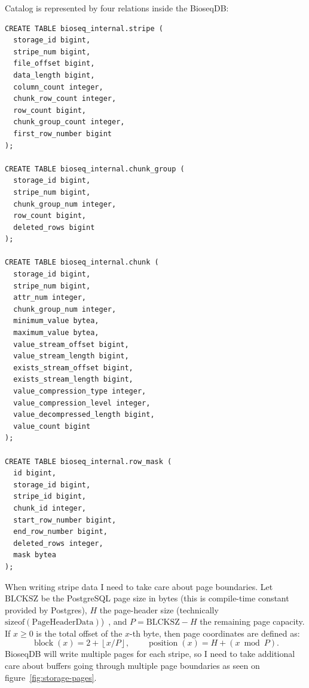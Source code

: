 Catalog is represented by four relations inside the BioseqDB:

\begin{minipage}{\linewidth}
\begin{lstlisting}[style=bioseq-storage-sql,caption={Metadata catalogs for flushed stripes.},label={lst:storage-metadata-catalogs}]
CREATE TABLE bioseq_internal.stripe (
  storage_id bigint,
  stripe_num bigint,
  file_offset bigint,
  data_length bigint,
  column_count integer,
  chunk_row_count integer,
  row_count bigint,
  chunk_group_count integer,
  first_row_number bigint
);

CREATE TABLE bioseq_internal.chunk_group (
  storage_id bigint,
  stripe_num bigint,
  chunk_group_num integer,
  row_count bigint,
  deleted_rows bigint
);

CREATE TABLE bioseq_internal.chunk (
  storage_id bigint,
  stripe_num bigint,
  attr_num integer,
  chunk_group_num integer,
  minimum_value bytea,
  maximum_value bytea,
  value_stream_offset bigint,
  value_stream_length bigint,
  exists_stream_offset bigint,
  exists_stream_length bigint,
  value_compression_type integer,
  value_compression_level integer,
  value_decompressed_length bigint,
  value_count bigint
);

CREATE TABLE bioseq_internal.row_mask (
  id bigint,
  storage_id bigint,
  stripe_id bigint,
  chunk_id integer,
  start_row_number bigint,
  end_row_number bigint,
  deleted_rows integer,
  mask bytea
);
\end{lstlisting}
\end{minipage}

When writing stripe data I need to take care about page boundaries.
Let $\mathrm{BLCKSZ}$ be the PostgreSQL page size in bytes (this is compile-time constant provided by Postgres), $H$ the
page-header size (technically $\mathrm{sizeof(PageHeaderData)}$)~\autocite{postgresql17_storage_page_layout}, and $P=\mathrm{BLCKSZ}-H$ the remaining page capacity.
If $x\geq0$ is the total offset of the $x$-th byte, then page coordinates are defined as:
\[
  \operatorname{block}(x)=2+\left\lfloor x/P\right\rfloor,
  \qquad
  \operatorname{position}(x)=H+(x\bmod P).
\]
BioseqDB will write multiple pages for each stripe, so I need to take additional care about buffers going through multiple page boundaries as seen on figure~\ref{fig:storage-pages}.

